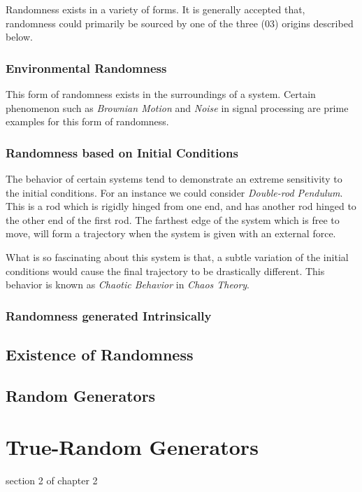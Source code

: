 Randomness exists in a variety of forms. It is generally accepted that, randomness could primarily be sourced by one of the three (03) origins described below.

\begin{sectionlist}
\subsubsection{Environmental Randomness}

This form of randomness exists in the surroundings of a system. Certain phenomenon such as \textit{Brownian Motion} and \textit{Noise} in signal processing are prime examples for this form of randomness. 

\subsubsection{Randomness based on Initial Conditions}

The behavior of certain systems tend to demonstrate an extreme sensitivity to the initial conditions. For an instance we could consider \textit{Double-rod Pendulum}. This is a rod which is rigidly hinged from one end, and has another rod hinged to the other end of the first rod. The farthest edge of the system which is free to move, will form a trajectory when the system is given with an external force.

What is so fascinating about this system is that, a subtle variation of the initial conditions would cause the final trajectory to be drastically different. This behavior is known as \textit{Chaotic Behavior} in \textit{Chaos Theory}. 

\subsubsection{Randomness generated Intrinsically}
\end{sectionlist}

\subsection{Existence of Randomness}

\subsection{Random Generators}

\section{True-Random Generators}
section 2 of chapter 2

